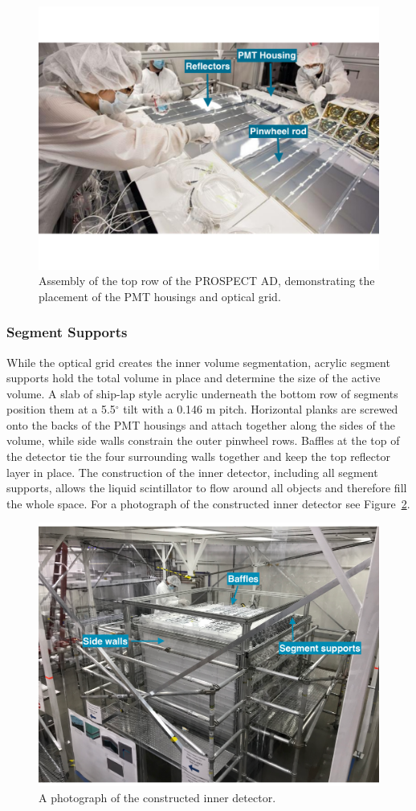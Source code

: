 \begin{figure}[]
	\centering
	\includegraphics[width=0.7\linewidth]{tex/4-prospect-images/RowAssembly}
	\caption[Construction of a row]{Assembly of the top row of the PROSPECT AD, demonstrating the placement of the PMT housings and optical grid.}
	\label{fig:rowassembly}
\end{figure}


\subsubsection{Segment Supports}

While the optical grid creates the inner volume segmentation, acrylic segment supports hold the total volume in place and determine the size of the active volume.
A slab of ship-lap style acrylic underneath the bottom row of segments position them at a 5.5$^{\circ}$ tilt with a 0.146 m pitch.
Horizontal planks are screwed onto the backs of the PMT housings and attach together along the sides of the volume, while side walls constrain the outer pinwheel rows. 
Baffles at the top of the detector tie the four surrounding walls together and keep the top reflector layer in place. 
The construction of the inner detector, including all segment supports, allows the liquid scintillator to flow around all objects and therefore fill the whole space.
For a photograph of the constructed inner detector see Figure~\ref{fig:completeddetector}.
\begin{figure}[h]
	\centering
	\includegraphics[width=0.7\linewidth]{tex/4-prospect-images/CompletedDetector}
	\caption[Completed inner detector]{A photograph of the constructed inner detector.}
	\label{fig:completeddetector}
\end{figure}


